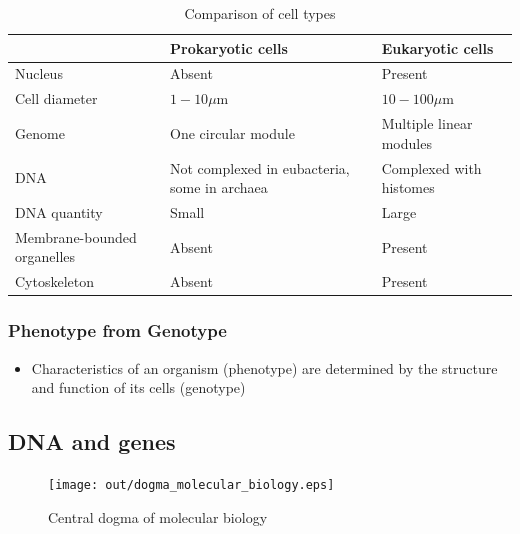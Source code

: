 \documentclass[a4paper]{article}
\begin{document}
\begin{table}[h!]
  \centering
  \begin{tabular}{@{}lll@{}}
    \toprule
                                & Prokaryotic cells                             & Eukaryotic cells \\
    \midrule
    Nucleus                     & Absent                                        & Present \\
    Cell diameter               & $1-10 \mu \mathrm{m}$                         & $10-100 \mu \mathrm{m}$ \\
    Genome                      & One circular module                           & Multiple linear modules \\
    DNA                         & Not complexed in eubacteria, some in archaea  & Complexed with histomes\\
    DNA quantity                & Small                                         & Large \\
    Membrane-bounded organelles & Absent                                        & Present \\
    Cytoskeleton                & Absent                                        & Present \\
    \bottomrule
  \end{tabular}
  \caption{Comparison of cell types}
  \label{tab:cell_comparison}
\end{table}
\FloatBarrier

\subsubsection{Phenotype from Genotype}

\begin{itemize}
  \item Characteristics of an organism (phenotype) are determined by the
        structure and function of its cells (genotype)
\end{itemize}

\subsection{DNA and genes}

\begin{figure}[h!]
  \centering
  \texttt{[image: out/dogma\_molecular\_biology.eps]}
  \caption{Central dogma of molecular biology}
  \label{fig:eukaryotic_cell}
\end{figure}
\FloatBarrier
\end{document}
